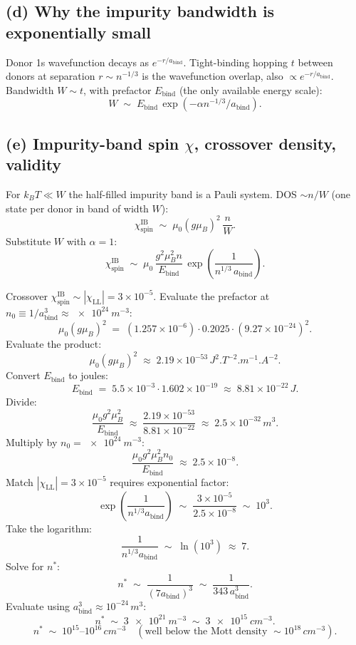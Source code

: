 \documentclass[11pt]{article}
\newcommand{\kB}{k_{B}}
\begin{document}
\subsection*{(d) Why the impurity bandwidth is exponentially small}

Donor 1s wavefunction decays as $e^{-r/a_{\text{bind}}}$. Tight-binding hopping $t$ between donors at separation $r\sim n^{-1/3}$ is the wavefunction overlap, also $\propto e^{-r/a_{\text{bind}}}$. Bandwidth $W\sim t$, with prefactor $E_{\text{bind}}$ (the only available energy scale):
\[
W \;\sim\; E_{\text{bind}}\,\exp\!\left(-\alpha n^{-1/3}/a_{\text{bind}}\right).
\]

\subsection*{(e) Impurity-band spin $\chi$, crossover density, validity}

For $\kB T\ll W$ the half-filled impurity band is a Pauli system. DOS $\sim n/W$ (one state per donor in band of width $W$):
\[
\chi_{\text{spin}}^{\text{IB}} \;\sim\; \mu_0(g\mu_B)^2\,\frac{n}{W}.
\]
Substitute $W$ with $\alpha=1$:
\begin{equation}
\boxed{\;\chi_{\text{spin}}^{\text{IB}} \;\sim\; \mu_0\,\frac{g^2\mu_B^2 n}{E_{\text{bind}}}\,\exp\!\left(\frac{1}{n^{1/3}\,a_{\text{bind}}}\right).\;}
\label{eq:chiIB}
\end{equation}

Crossover $\chi_{\text{spin}}^{\text{IB}}\sim|\chi_{\text{LL}}|=3\times 10^{-5}$. Evaluate the prefactor at $n_0\equiv 1/a_{\text{bind}}^3\approx \SI{e24}{m^{-3}}$:
\[
\mu_0(g\mu_B)^2 \;=\; (1.257\times 10^{-6})\cdot 0.2025\cdot(9.27\times 10^{-24})^2.
\]
Evaluate the product:
\[
\mu_0(g\mu_B)^2 \;\approx\; 2.19\times 10^{-53}\,\si{J^2.T^{-2}.m^{-1}.A^{-2}}.
\]
Convert $E_{\text{bind}}$ to joules:
\[
E_{\text{bind}} \;=\; 5.5\times 10^{-3}\cdot 1.602\times 10^{-19} \;\approx\; 8.81\times 10^{-22}\,\si{J}.
\]
Divide:
\[
\frac{\mu_0 g^2\mu_B^2}{E_{\text{bind}}} \;\approx\; \frac{2.19\times 10^{-53}}{8.81\times 10^{-22}} \;\approx\; 2.5\times 10^{-32}\,\si{m^3}.
\]
Multiply by $n_0=\SI{e24}{m^{-3}}$:
\[
\frac{\mu_0 g^2\mu_B^2 n_0}{E_{\text{bind}}} \;\approx\; 2.5\times 10^{-8}.
\]
Match $|\chi_{\text{LL}}|=3\times 10^{-5}$ requires exponential factor:
\[
\exp\!\left(\frac{1}{n^{1/3} a_{\text{bind}}}\right) \;\sim\; \frac{3\times 10^{-5}}{2.5\times 10^{-8}} \;\sim\; 10^3.
\]
Take the logarithm:
\[
\frac{1}{n^{1/3} a_{\text{bind}}} \;\sim\; \ln(10^3) \;\approx\; 7.
\]
Solve for $n^*$:
\[
n^* \;\sim\; \frac{1}{(7 a_{\text{bind}})^3} \;\sim\; \frac{1}{343\,a_{\text{bind}}^3}.
\]
Evaluate using $a_{\text{bind}}^3\approx 10^{-24}\,\si{m^3}$:
\[
n^* \;\sim\; \SI{3e21}{m^{-3}} \;\sim\; \SI{3e15}{cm^{-3}}.
\]
\begin{equation}
\boxed{\;n^*\;\sim\;10^{15}\text{--}10^{16}\,\si{cm^{-3}}\quad(\text{well below the Mott density }\sim 10^{18}\,\si{cm^{-3}}).\;}
\label{eq:nstar}
\end{equation}
\end{document}
